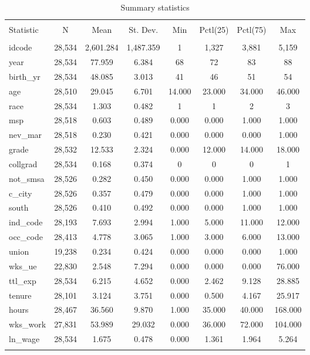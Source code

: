 \documentclass[
  12pt,
]{article}
\begin{document}
\begin{table}[ht] \centering 
  \caption{Summary statistics} 
  \label{tab:tab1nls} 
\begin{tabular}{@{\extracolsep{5pt}}lccccccc} 
\\[-1.8ex]\hline 
\hline \\[-1.8ex] 
Statistic & \multicolumn{1}{c}{N} & \multicolumn{1}{c}{Mean} & \multicolumn{1}{c}{St. Dev.} & \multicolumn{1}{c}{Min} & \multicolumn{1}{c}{Pctl(25)} & \multicolumn{1}{c}{Pctl(75)} & \multicolumn{1}{c}{Max} \\ 
\hline \\[-1.8ex] 
idcode & 28,534 & 2,601.284 & 1,487.359 & 1 & 1,327 & 3,881 & 5,159 \\ 
year & 28,534 & 77.959 & 6.384 & 68 & 72 & 83 & 88 \\ 
birth\_yr & 28,534 & 48.085 & 3.013 & 41 & 46 & 51 & 54 \\ 
age & 28,510 & 29.045 & 6.701 & 14.000 & 23.000 & 34.000 & 46.000 \\ 
race & 28,534 & 1.303 & 0.482 & 1 & 1 & 2 & 3 \\ 
msp & 28,518 & 0.603 & 0.489 & 0.000 & 0.000 & 1.000 & 1.000 \\ 
nev\_mar & 28,518 & 0.230 & 0.421 & 0.000 & 0.000 & 0.000 & 1.000 \\ 
grade & 28,532 & 12.533 & 2.324 & 0.000 & 12.000 & 14.000 & 18.000 \\ 
collgrad & 28,534 & 0.168 & 0.374 & 0 & 0 & 0 & 1 \\ 
not\_smsa & 28,526 & 0.282 & 0.450 & 0.000 & 0.000 & 1.000 & 1.000 \\ 
c\_city & 28,526 & 0.357 & 0.479 & 0.000 & 0.000 & 1.000 & 1.000 \\ 
south & 28,526 & 0.410 & 0.492 & 0.000 & 0.000 & 1.000 & 1.000 \\ 
ind\_code & 28,193 & 7.693 & 2.994 & 1.000 & 5.000 & 11.000 & 12.000 \\ 
occ\_code & 28,413 & 4.778 & 3.065 & 1.000 & 3.000 & 6.000 & 13.000 \\ 
union & 19,238 & 0.234 & 0.424 & 0.000 & 0.000 & 0.000 & 1.000 \\ 
wks\_ue & 22,830 & 2.548 & 7.294 & 0.000 & 0.000 & 0.000 & 76.000 \\ 
ttl\_exp & 28,534 & 6.215 & 4.652 & 0.000 & 2.462 & 9.128 & 28.885 \\ 
tenure & 28,101 & 3.124 & 3.751 & 0.000 & 0.500 & 4.167 & 25.917 \\ 
hours & 28,467 & 36.560 & 9.870 & 1.000 & 35.000 & 40.000 & 168.000 \\ 
wks\_work & 27,831 & 53.989 & 29.032 & 0.000 & 36.000 & 72.000 & 104.000 \\ 
ln\_wage & 28,534 & 1.675 & 0.478 & 0.000 & 1.361 & 1.964 & 5.264 \\ 
\hline \\[-1.8ex] 
\end{tabular} 
\end{table}
\end{document}
